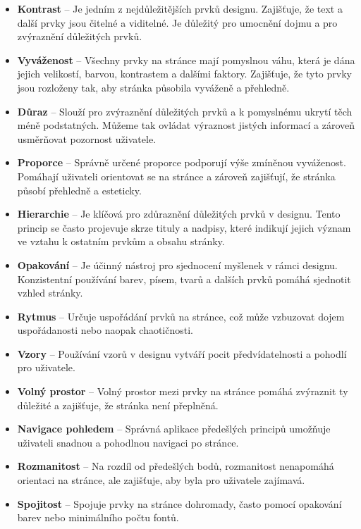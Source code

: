 \begin{itemize}
  \item \textbf{Kontrast} -- Je jedním z nejdůležitějších prvků designu. Zajišťuje, že text a další prvky jsou čitelné a viditelné. Je důležitý pro umocnění dojmu a pro zvýraznění důležitých prvků.
  \item \textbf{Vyváženost} -- Všechny prvky na stránce mají pomyslnou váhu, která je dána jejich velikostí, barvou, kontrastem a dalšími faktory. Zajišťuje, že tyto prvky jsou rozloženy tak, aby stránka působila vyváženě a přehledně.
  \item \textbf{Důraz} -- Slouží pro zvýraznění důležitých prvků a k pomyslnému ukrytí těch méně podstatných. Můžeme tak ovládat výraznost jistých informací a zároveň usměrňovat pozornost uživatele.
  \item \textbf{Proporce} -- Správně určené proporce podporují výše zmíněnou vyváženost. Pomáhají uživateli orientovat se na stránce a zároveň zajišťují, že stránka působí přehledně a esteticky.
  \item \textbf{Hierarchie} -- Je klíčová pro zdůraznění důležitých prvků v designu. Tento princip se často projevuje skrze tituly a nadpisy, které indikují jejich význam ve vztahu k ostatním prvkům a obsahu stránky.
  \item \textbf{Opakování} -- Je účinný nástroj pro sjednocení myšlenek v rámci designu. Konzistentní používání barev, písem, tvarů a dalších prvků pomáhá sjednotit vzhled stránky.
  \item \textbf{Rytmus} -- Určuje uspořádání prvků na stránce, což může vzbuzovat dojem uspořádanosti nebo naopak chaotičnosti.
  \item \textbf{Vzory} -- Používání vzorů v designu vytváří pocit předvídatelnosti a pohodlí pro uživatele.
  \item \textbf{Volný prostor} -- Volný prostor mezi prvky na stránce pomáhá zvýraznit ty důležité a zajišťuje, že stránka není přeplněná.
  \item \textbf{Navigace pohledem} -- Správná aplikace předešlých principů umožňuje uživateli snadnou a pohodlnou navigaci po stránce.
  \item \textbf{Rozmanitost} -- Na rozdíl od předešlých bodů, rozmanitost nenapomáhá orientaci na stránce, ale zajišťuje, aby byla pro uživatele zajímavá.
  \item \textbf{Spojitost} -- Spojuje prvky na stránce dohromady, často pomocí opakování barev nebo minimálního počtu fontů.
\end{itemize}

